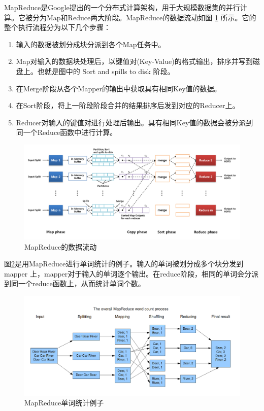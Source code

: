 MapReduce是Google提出的一个分布式计算架构，用于大规模数据集的并行计算。它被分为Map和Reduce两大阶段。MapReduce的数据流动如图 \ref{mr_data_flow} 所示。它的整个执行流程分为以下几个步骤：

\begin{enumerate}
\item 输入的数据被划分成块分派到各个Map任务中。
\item Map对输入的数据块处理后，以键值对(Key-Value)的格式输出，排序并写到磁盘上。也就是图中的 Sort and spills to disk 阶段。
\item 在Merge阶段从各个Mapper的输出中获取具有相同Key值的数据。
\item 在Sort阶段，将上一阶段阶段合并的结果排序后发到对应的Reducer上。
\item Reducer对输入的键值对进行处理后输出。具有相同Key值的数据会被分派到同一个Reduce函数中进行计算。
\end{enumerate}

\begin{figure}[h]
\centering\includegraphics[width=6in]{picture/ch_preliminary/mr_data_flow} 
\caption{MapReduce的数据流动}\label{mr_data_flow} 
\end{figure} 

图\ref{mr_word_count}是用MapReduce进行单词统计的例子。输入的单词被划分成多个块分发到 mapper 上，mapper对于输入的单词逐个输出。在reduce阶段，相同的单词会分派到同一个reduce函数上，从而统计单词个数。

\begin{figure}[!ht]
\centering\includegraphics[width=6in]{picture/ch_preliminary/mr_word_count} 
\caption{MapReduce单词统计例子}\label{mr_word_count} 
\end{figure} 

